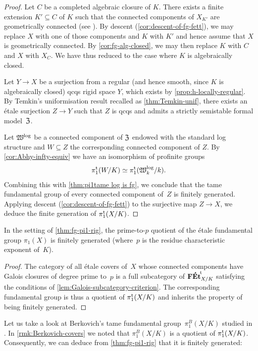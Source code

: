 \begin{proof} 
Let $C$ be a completed algebraic closure of $K$. There exists a finite extension $K'\subseteq C$ of $K$ such that the connected components of $X_{K'}$ are geometrically connected (see \cite[Corollary 3.2.3]{Conrad:IrreducibleComponents}). By descent (\cref{cor:descent-of-fg-fett}), we may replace $X$ with one of those components and $K$ with $K'$ and hence assume that $X$ is geometrically connected. By \cref{cor:fg-alg-closed}, we may then replace $K$ with $C$ and $X$ with $X_C$. We have thus reduced to the case where $K$ is algebraically closed. 
   
Let $Y\to X$ be a surjection from a regular (and hence smooth, since $K$ is algebraically closed) qcqs rigid space $Y$, which exists by \cref{prop:h-locally-regular}. By Temkin's uniformisation result recalled as \cref{thm:Temkin-unif}, there exists an \'etale surjection $Z\to Y$ such that $Z$ is qcqs and admits a strictly semistable formal model~${\mathfrak{Z}}$.

Let ${\mathfrak{W}}^{\rm log}$ be a connected component of ${\mathfrak{Z}}$ endowed with the standard log structure and $W\subseteq Z$ the corresponding connected component of $Z$. By \cref{cor:Abhy-infty-equiv} we have an isomorphism of profinite groups
\[ 
    \pi_1^{\mathrm{t}}(W/K) \simeq \pi_1^{\mathrm{t}}({\mathfrak{W}}^{\rm log}_k/k).
\]
Combining this with \cref{thm:pi1tame log is fg}, we conclude that the tame fundamental group of every connected component of~$Z$ is finitely generated. Applying descent (\cref{cor:descent-of-fg-fett}) to the surjective map $Z\to X$, we deduce the finite generation of $\pi_1^{\mathrm{t}}(X/K)$.
\end{proof}

\begin{cor}
    In the setting of \cref{thm:fg-pi1-rig}, the prime-to-$p$ quotient of the étale fundamental group $\pi_1(X)$ is finitely generated (where~$p$ is the residue characteristic exponent of~$K$).
\end{cor}

\begin{proof}
The category of all étale covers of~$X$ whose connected components have Galois closures of degree prime to~$p$ is a full subcategory of ${\mathbf{F\acute{E}t}}^{\!\mathrm{t}}_{X/K}$ satisfying the conditions of \cref{lem:Galois-subcategory-criterion}.
The corresponding fundamental group is thus a quotient of $\pi_1^{\mathrm{t}}(X/K)$ and inherits the property of being finitely generated.
\end{proof}

Let us take a look at Berkovich's tame fundamental group~$\pi_1^B(X/K)$ studied in \cite[\S6.3]{Berkovich:EtaleCohomology}.
In \cref{rmk:Berkovich-covers} we noted that $\pi_1^B(X/K)$ is a quotient of $\pi_1^{\mathrm{t}}(X/K)$.
Consequently, we can deduce from \cref{thm:fg-pi1-rig} that it is finitely generated:

